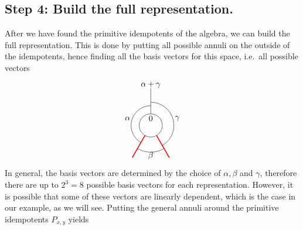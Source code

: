 \subsection*{Step 4: Build the full representation.} After we have found the primitive idempotents of the algebra, we can build the full representation. This is done by putting all possible annuli on the outside of the idempotents, hence finding all the basis vectors for this space, i.e.\ all possible vectors
	\begin{equation}
		\begin{tikzpicture}[scale=1,baseline=(current bounding box.center)]
		\draw (0,0) circle (0.5cm);
		\draw[red,line width=0.4mm]
		\foreach \a in {-60, -120} {
			(\a:0.5) -- (\a:1.6)
		};
		\draw ([shift=(-60:1cm)]0,0) arc (-60:90:1cm);
		\draw ([shift=(-120:1.15cm)]0,0) arc (-120:-60:1.15cm);
		\draw ([shift=(240:0.85cm)]0,0) arc (240:90:0.85cm);
		\draw[] (90:0.5) -- (90:1.6);
		\node at (90:.3cm){$0$};\node at (90:1.75cm){$\alpha+\gamma$};
		\node at (-1,0.3) {$\alpha$};
		\node at (1.15,0.3) {$\gamma$};
		\node at (0,-1.3) {$\beta$};
		\end{tikzpicture}
	\end{equation}
In general, the basis vectors are determined by the choice of $\alpha,\beta$ and $\gamma$, therefore there are up to $2^3=8$ possible basis vectors for each representation. However, it is possible that some of these vectors are linearly dependent, which is the case in our example, as we will see. Putting the general annuli around the primitive idempotents $P_{x,y}$ yields
